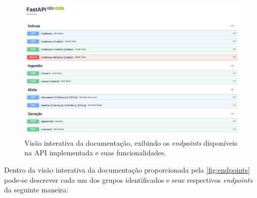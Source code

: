 \documentclass[a4paper, 12pt]{article}
\begin{document}
    \clearpage

    \begin{figure}[ht]
        \includegraphics[width=\textwidth,height=0.9\textheight,keepaspectratio]{endpoints.png}
        \centering
        \caption{Visão interativa da documentação, exibindo os \textit{endpoints} disponíveis na API implementada e suas funcionalidades.}
        \centering
        \label{fig:endpoints}
    \end{figure}

    Dentro da visão interativa da documentação proporcionada pela \autoref{fig:endpoints} pode-se descrever cada um dos grupos identificados e seus respectivos \textit{endpoints} da seguinte maneira:
\end{document}
